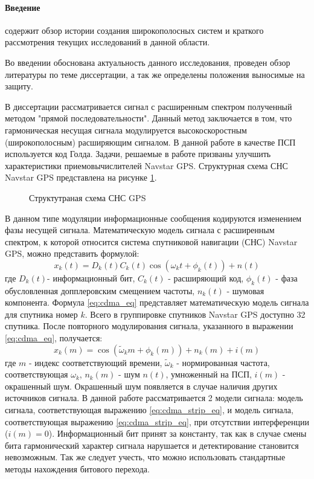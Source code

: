 \paragraph{Введение} содержит обзор истории создания широкополосных систем и краткого рассмотрения текущих исследований в данной области.

Во введении обоснована актуальность данного исследования, проведен обзор литературы по теме диссертации, а так же
определены положения выносимые на защиту.

В диссертации рассматривается сигнал с расширенным спектром полученный методом "прямой последовательности".
Данный метод заключается в том, что гармоническая несущая сигнала модулируется высокоскоростным (широкополосным)
расширяющим сигналом. В данной работе в качестве ПСП используется код Голда. Задачи, решаемые в работе призваны
улучшить характеристики приемовычислителей Navstar GPS. Структурная схема СНС Navstar GPS представлена на рисунке
\ref{pic:sec1_gnss_system}.

\begin{figure}[H]
	\center{}
	\caption{Структутраная схема СНС GPS}
	\label{pic:sec1_gnss_system}
\end{figure}

В данном типе модуляции информационные сообщения кодируются изменением фазы несущей сигнала.
Математическую модель сигнала с расширенным спектром, к которой относится система спутниковой навигации (СНС) Navstar GPS, можно представить формулой:
\begin{equation}
	\label{eq:cdma_eq}
	x_k(t)=D_k(t)C_k(t)\cos{(\omega_{k}t + \phi_k(t))} + n(t)
\end{equation}
где ${D_k}(t)$- информационный бит, ${C_k}(t)$ - расширяющий код, ${\phi_k(t)}$ - фаза обусловленная допплеровским смещением частоты, 
${n_k(t)}$ - шумовая компонента. Формула  \ref{eq:cdma_eq} представляет математическую модель сигнала для спутника номер ${k}$.
Всего в группировке спутников Navstar GPS доступно 32 спутника. После повторного модулирования сигнала, указанного в выражении \ref{eq:cdma_eq},
получается:
\begin{equation}
	\label{eq:cdma_strip_eq}
	x_k(m)=\cos{(\tilde{\omega}_{k}m + \phi_k(m))} + n_k(m) + i(m)
\end{equation}
где ${m}$ - индекс соответствующий времени, ${\tilde{\omega}_k}$ - нормированная частота, соответствующая ${\omega_k}$, ${n_k}(m)$ - шум ${n(t)}$, умноженный на ПСП,
${i(m)}$ - окрашенный шум. Окрашенный шум появляется в случае наличия других источников сигнала.
В данной работе рассматривается 2 модели сигнала: модель сигнала, соответствующая выражению \ref{eq:cdma_strip_eq}, и модель сигнала,
соответствующая выражению \ref{eq:cdma_strip_eq}, при отсутствии интерференции (${i(m)=0}$).
Информационный бит принят за константу, так как в случае смены бита гармонический характер сигнала нарушается и детектирование становится невозможным.
Так же следует учесть, что можно использовать стандартные методы нахождения битового перехода.


